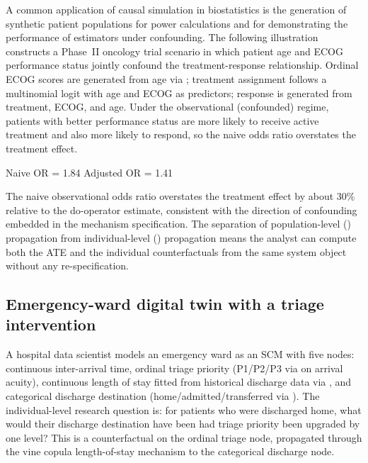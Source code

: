 \documentclass[article]{jss}
\begin{document}
A common application of causal simulation in biostatistics is the generation of
synthetic patient populations for power calculations and for demonstrating the
performance of estimators under confounding. The following illustration constructs
a Phase~II oncology trial scenario in which patient age and ECOG performance status
jointly confound the treatment-response relationship. Ordinal ECOG scores are
generated from age via ; treatment assignment follows a
multinomial logit with age and ECOG as predictors; response is generated from
treatment, ECOG, and age. Under the observational (confounded) regime, patients
with better performance status are more likely to receive active treatment and also
more likely to respond, so the naive odds ratio overstates the treatment effect.


\begin{CodeOutput}
Naive OR = 1.84   Adjusted OR = 1.41
\end{CodeOutput}

\noindent
The naive observational odds ratio overstates the treatment effect by about 30\%
relative to the do-operator estimate, consistent with the direction of confounding
embedded in the mechanism specification. The separation of population-level
() propagation from individual-level ()
propagation means the analyst can compute both the ATE and the individual
counterfactuals from the same system object without any re-specification.

\subsection{Emergency-ward digital twin with a triage intervention}

A hospital data scientist models an emergency ward as an SCM with five nodes:
continuous inter-arrival time, ordinal triage priority (P1/P2/P3 via
 on arrival acuity), continuous length of stay fitted from
historical discharge data via , and categorical discharge
destination (home/admitted/transferred via ). The
individual-level research question is: for patients who were discharged home, what
would their discharge destination have been had triage priority been upgraded by
one level? This is a counterfactual on the ordinal triage node, propagated through
the vine copula length-of-stay mechanism to the categorical discharge node.
\end{document}
